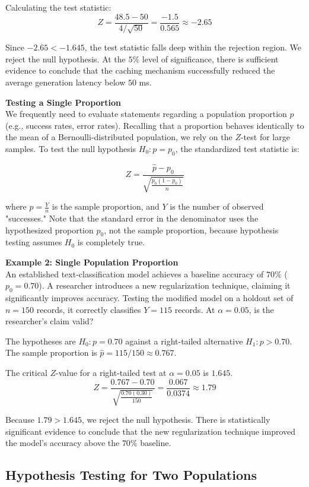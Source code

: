 \documentclass{article}
\begin{document}
Calculating the test statistic:
$$ Z = \frac{48.5 - 50}{4 / \sqrt{50}} = \frac{-1.5}{0.565} \approx -2.65 $$

Since $-2.65 < -1.645$, the test statistic falls deep within the rejection region. We reject the null hypothesis. At the $5\%$ level of significance, there is sufficient evidence to conclude that the caching mechanism successfully reduced the average generation latency below $50$ ms.

\vspace{1em}
\textbf{Testing a Single Proportion} \\
We frequently need to evaluate statements regarding a population proportion $p$ (e.g., success rates, error rates). Recalling that a proportion behaves identically to the mean of a Bernoulli-distributed population, we rely on the $Z$-test for large samples. To test the null hypothesis $H_0: p = p_0$, the standardized test statistic is:

$$ Z = \frac{\hat{p} - p_0}{\sqrt{\frac{p_0(1 - p_0)}{n}}} $$

where $\hat{p} = \frac{Y}{n}$ is the sample proportion, and $Y$ is the number of observed "successes." Note that the standard error in the denominator uses the hypothesized proportion $p_0$, not the sample proportion, because hypothesis testing assumes $H_0$ is completely true.

\textbf{Example 2: Single Population Proportion} \\
An established text-classification model achieves a baseline accuracy of $70\%$ ($p_0 = 0.70$). A researcher introduces a new regularization technique, claiming it significantly improves accuracy. Testing the modified model on a holdout set of $n=150$ records, it correctly classifies $Y=115$ records. At $\alpha=0.05$, is the researcher's claim valid?

The hypotheses are $H_0: p = 0.70$ against a right-tailed alternative $H_1: p > 0.70$. The sample proportion is $\hat{p} = 115/150 \approx 0.767$. 

The critical $Z$-value for a right-tailed test at $\alpha=0.05$ is $1.645$. 
$$ Z = \frac{0.767 - 0.70}{\sqrt{\frac{0.70(0.30)}{150}}} = \frac{0.067}{0.0374} \approx 1.79 $$

Because $1.79 > 1.645$, we reject the null hypothesis. There is statistically significant evidence to conclude that the new regularization technique improved the model's accuracy above the $70\%$ baseline.

\subsection{Hypothesis Testing for Two Populations}
\end{document}
